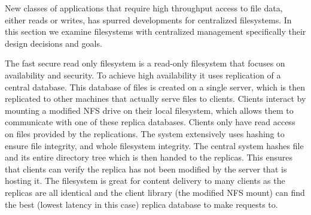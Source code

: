 New classes of applications that require high throughput access to file data,
either reads or writes, has spurred developments for centralized filesystems.
In this section we examine filesystems with centralized management
specifically their design decisions and goals.


The fast secure read only filesystem \cite{Fu2000} is a read-only filesystem
that focuses on availability and security. To achieve high availability it
uses replication of a central database. This database of files is created on a
single server, which is then replicated to other machines that actually serve
files to clients. Clients interact by mounting a modified NFS drive on their
local filesystem, which allows them to communicate with one of these replica
databases. Clients only have read access on files provided by the
replications. The system extensively uses hashing to ensure file integrity,
and whole filesystem integrity. The central system hashes file and its entire
directory tree which is then handed to the replicas. This ensures that clients
can verify the replica has not been modified by the server that is hosting it.
The filesystem is great for content delivery to many clients as the replicas
are all identical and the client library (the modified NFS mount) can find the
best (lowest latency in this case) replica database to make requests to.


